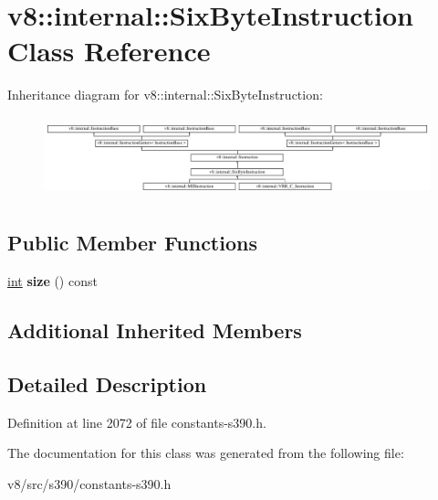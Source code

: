 \hypertarget{classv8_1_1internal_1_1SixByteInstruction}{}\section{v8\+:\+:internal\+:\+:Six\+Byte\+Instruction Class Reference}
\label{classv8_1_1internal_1_1SixByteInstruction}
Inheritance diagram for v8\+:\+:internal\+:\+:Six\+Byte\+Instruction\+:\begin{figure}[H]
\begin{center}
\leavevmode
\includegraphics[height=2.364865cm]{classv8_1_1internal_1_1SixByteInstruction}
\end{center}
\end{figure}
\subsection*{Public Member Functions}
\begin{DoxyCompactItemize}
\item 
\mbox{\label{classv8_1_1internal_1_1SixByteInstruction_a3d331f82e62f9bf6de7f9c5e3f916339}} 
\mbox{\hyperlink{classint}{int}} {\bfseries size} () const
\end{DoxyCompactItemize}
\subsection*{Additional Inherited Members}


\subsection{Detailed Description}


Definition at line 2072 of file constants-\/s390.\+h.



The documentation for this class was generated from the following file\+:\begin{DoxyCompactItemize}
\item 
v8/src/s390/constants-\/s390.\+h\end{DoxyCompactItemize}
